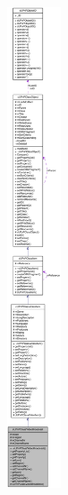 \begin{figure}[H]
\begin{center}
\leavevmode
\includegraphics[height=400pt]{classcUPnPClassVideoBroadcast__coll__graph}
\end{center}
\end{figure}
